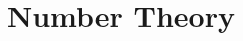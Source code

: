 \documentclass[letterpaper]{article}
\begin{document}
\setcounter{section}{3}
\section{Number Theory}

\end{document}
